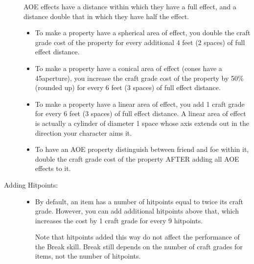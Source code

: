 \begin{description}
	AOE effects have a distance within which they have a full effect, and a distance double that in which they have half the effect.
	\begin{itemize}
		\item To make a property have a spherical area of effect, you double the craft grade cost of the property for every additional 4 feet (2 spaces) of full effect distance.
		\item To make a property have a conical area of effect (cones have a 45\degree   aperture), you increase the craft grade cost of the property by 50\% (rounded up) for every 6 feet (3 spaces) of full effect distance.
		\item To make a property have a linear area of effect, you add 1 craft grade for every 6 feet (3 spaces) of full effect distance. A linear area of effect is actually a cylinder of diameter 1 space whose axis extends out in the direction your character aims it.
		\item To have an AOE property distinguish between friend and foe within it, double the craft grade cost of the property AFTER adding all AOE effects to it.
	\end{itemize}
	\item[Adding Hitpoints:] \hfill
	\begin{itemize}
		\item By default, an item has a number of hitpoints equal to twice its craft grade. However, you can add additional hitpoints above that, which increases the cost by 1 craft grade for every 9 hitpoints.
		
		Note that hitpoints added this way do not affect the performance of the Break skill. Break still depends on the number of craft grades for items, not the number of hitpoints. 
	\end{itemize}
\end{description}

